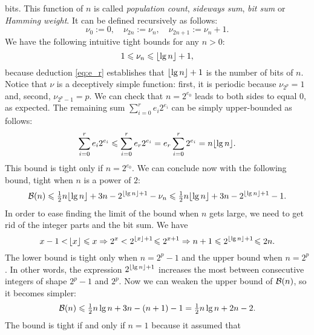 bits. This function of \(n\) is called \emph{population count},
\emph{sideways sum}, \emph{bit sum} or \emph{Hamming weight}. It can
be defined recursively as follows:
\begin{equation}
\nu_{0} := 0,\quad \nu_{2n} := \nu_{n},\quad
\nu_{2n+1} := \nu_{n} + 1.\label{def:nu}
\end{equation}
We have the following intuitive tight bounds for any \(n>0\):
\[
1 \leqslant \nu_{n} \leqslant \lfloor{\lg n}\rfloor + 1,
\]
because deduction \eqref{eq:e_r}  establishes that
\(\lfloor{\lg n}\rfloor + 1\) is the number of bits of \(n\). Notice that
\(\nu\) is a deceptively simple function: first, it is periodic
because \(\nu_{2^p} = 1\) and, second, \(\nu_{2^p-1}=p\). We can check
that \(n=2^{e_0}\) leads to both sides to equal \(0\), as
expected. The remaining sum \(\sum_{i=0}^{r}{e_i2^{e_i}}\) can be
simply upper\hyp{}bounded as follows:
\begin{equation}
\sum_{i=0}^{r}{e_i2^{e_i}}
 \leqslant \sum_{i=0}^{r}{e_r2^{e_i}} = e_r\sum_{i=0}^{r}{2^{e_i}}
= n \lfloor{\lg n}\rfloor.\label{ineq:upper_n_lg_n}
\end{equation}
This bound is tight only if \(n=2^{e_0}\). We can conclude now with
the following bound, tight when \(n\) is a power of \(2\):
\begin{equation*}
\mathcal{B}(n) 
  \leqslant \tfrac{1}{2}n\lfloor{\lg n}\rfloor + 3n
             - 2^{\lfloor{\lg n}\rfloor + 1} - \nu_{n}
  \leqslant \tfrac{1}{2}n \lfloor{\lg n}\rfloor + 3n - 2^{\lfloor{\lg n}\rfloor + 1} - 1.
\end{equation*}
In order to ease finding the limit of the bound when \(n\) gets large,
we need to get rid of the integer parts and the bit sum. We have
\begin{equation}
x - 1 <\! \lfloor{x}\rfloor \leqslant x \Rightarrow 2^x < 2^{\lfloor{x}\rfloor+1}
\!\leqslant 2^{x+1} \Rightarrow n + 1 \leqslant 2^{\lfloor{\lg n}\rfloor+1}
\!\leqslant 2n.
\label{ineq:upper_minus_2}
\end{equation}
The lower bound is tight only when \(n=2^p-1\) and the upper bound
when \(n=2^p\). In other words, the expression \(2^{\lfloor{\lg n}\rfloor+1}\)
increases the most between consecutive integers of shape \(2^p-1\) and
\(2^p\). Now we can weaken the upper bound of \(\mathcal{B}(n)\), so it
becomes simpler:
\begin{equation}
\mathcal{B}(n) \leqslant \tfrac{1}{2}{n \lg n} + 3n - (n+1) - 1
                   = \tfrac{1}{2}{n \lg n} + 2n - 2.
\label{ineq:B_upper_simpl}
\end{equation}
The bound is tight if and only if \(n=1\) because it assumed that
